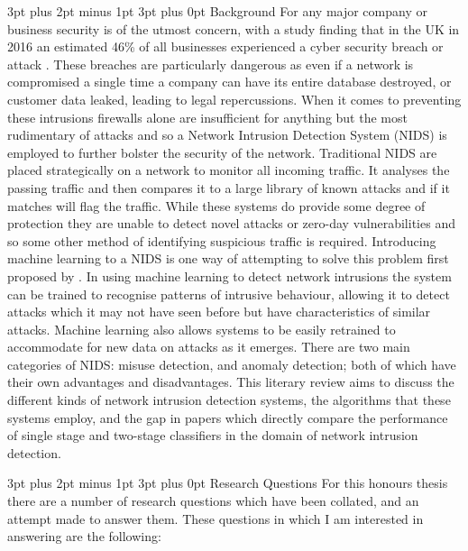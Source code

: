 \documentclass[12pt,a4paper]{article}
\makeatletter
\renewcommand\subsection{\@startsection {subsection}{1}{2mm} %
                               {3pt plus 2pt minus 1pt} %
                               {3pt plus 0pt} %
                               {\normalfont\bfseries}}
\makeatother
\begin{document}
\subsection{Background}
	For any major company or business security is of the utmost concern, with a study finding that in the UK in 2016 an estimated 46\% of all businesses experienced a cyber security breach or attack \cite{securitysurvey2017}. These breaches are particularly dangerous as even if a network is compromised a single time a company can have its entire database destroyed, or customer data leaked, leading to legal repercussions. When it comes to preventing these intrusions firewalls alone are insufficient for anything but the most rudimentary of attacks and so a Network Intrusion Detection System (NIDS) is employed to further bolster the security of the network. Traditional NIDS are placed strategically on a network to monitor all incoming traffic. It analyses the passing traffic and then compares it to a large library of known attacks and if it matches will flag the traffic. While these systems do provide some degree of protection they are unable to detect novel attacks or zero-day vulnerabilities and so some other method of identifying suspicious traffic is required. Introducing machine learning to a NIDS is one way of attempting to solve this problem first proposed by \cite{denning1987intrusion}. In using machine learning to detect network intrusions the system can be trained to recognise patterns of intrusive behaviour, allowing it to detect attacks which it may not have seen before but have characteristics of similar attacks. Machine learning also allows systems to be easily retrained to accommodate for new data on attacks as it emerges. There are two main categories of NIDS: misuse detection, and anomaly detection; both of which have their own advantages and disadvantages. This literary review aims to discuss the different kinds of network intrusion detection systems, the algorithms that these systems employ, and the gap in papers which directly compare the performance of single stage and two-stage classifiers in the domain of network intrusion detection.
		
\subsection{Research Questions}
	For this honours thesis there are a number of research questions which have been collated, and an attempt made to answer them. These questions in which I am interested in answering are the following: 
		
\end{document}
